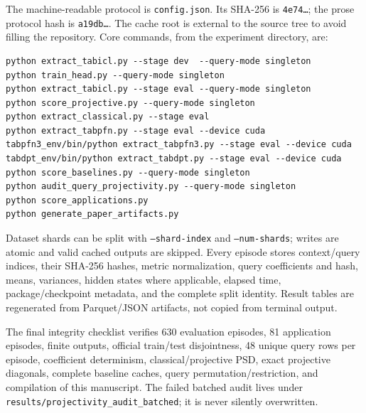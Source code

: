 The machine-readable protocol is \texttt{config.json}.  Its SHA-256 is
\texttt{4e74\ldots}; the prose protocol hash is \texttt{a19db\ldots}.
The cache root is external to the source tree to avoid filling the repository.
Core commands, from the experiment directory, are:
\begin{verbatim}
python extract_tabicl.py --stage dev  --query-mode singleton
python train_head.py --query-mode singleton
python extract_tabicl.py --stage eval --query-mode singleton
python score_projective.py --query-mode singleton
python extract_classical.py --stage eval
python extract_tabpfn.py --stage eval --device cuda
tabpfn3_env/bin/python extract_tabpfn3.py --stage eval --device cuda
tabdpt_env/bin/python extract_tabdpt.py --stage eval --device cuda
python score_baselines.py --query-mode singleton
python audit_query_projectivity.py --query-mode singleton
python score_applications.py
python generate_paper_artifacts.py
\end{verbatim}
Dataset shards can be split with \texttt{--shard-index} and
\texttt{--num-shards}; writes are atomic and valid cached outputs are skipped.
Every episode stores context/query indices, their SHA-256 hashes, metric
normalization, query coefficients and hash, means, variances, hidden states
where applicable, elapsed time, package/checkpoint metadata, and the complete
split identity.  Result tables are regenerated from Parquet/JSON artifacts,
not copied from terminal output.

The final integrity checklist verifies 630 evaluation episodes, 81 application
episodes, finite outputs, official train/test disjointness, 48 unique query
rows per episode, coefficient determinism, classical/projective PSD, exact
projective diagonals, complete baseline caches, query permutation/restriction,
and compilation of this manuscript.  The failed batched audit lives under
\texttt{results/projectivity\_audit\_batched}; it is never silently overwritten.

